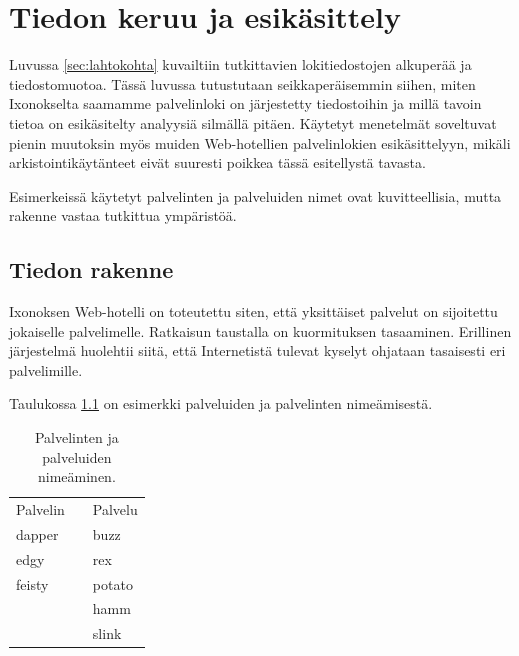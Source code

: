 
\chapter{Tiedon keruu ja esikäsittely}

Luvussa \ref{sec:lahtokohta} kuvailtiin tutkittavien lokitiedostojen
alkuperää ja tiedostomuotoa. Tässä luvussa tutustutaan
seikkaperäisemmin siihen, miten Ixonokselta saamamme palvelinloki on
järjestetty tiedostoihin ja millä tavoin tietoa on esikäsitelty
analyysiä silmällä pitäen. Käytetyt menetelmät soveltuvat pienin
muutoksin myös muiden Web-hotellien palvelinlokien esikäsittelyyn,
mikäli arkistointikäytänteet eivät suuresti poikkea tässä esitellystä
tavasta.

Esimerkeissä käytetyt palvelinten ja palveluiden nimet ovat
kuvitteellisia, mutta rakenne vastaa tutkittua ympäristöä.


\section{Tiedon rakenne}

Ixonoksen Web-hotelli on toteutettu siten, että yksittäiset palvelut on
sijoitettu jokaiselle palvelimelle. Ratkaisun taustalla on
kuormituksen tasaaminen. Erillinen järjestelmä huolehtii siitä, että
Internetistä tulevat kyselyt ohjataan tasaisesti eri
palvelimille. 

Taulukossa \ref{nimet} on esimerkki palveluiden ja
palvelinten nimeämisestä.

\begin{table}[h]
\centering
\begin{tabular}{lll}
Palvelin && Palvelu \\
\cline{1-1}\cline{3-3}
dapper && buzz \\
edgy && rex \\
feisty && potato \\
&& hamm \\
&& slink \\
\end{tabular}
\caption{Palvelinten ja palveluiden nimeäminen.}
\label{nimet}
\end{table}

